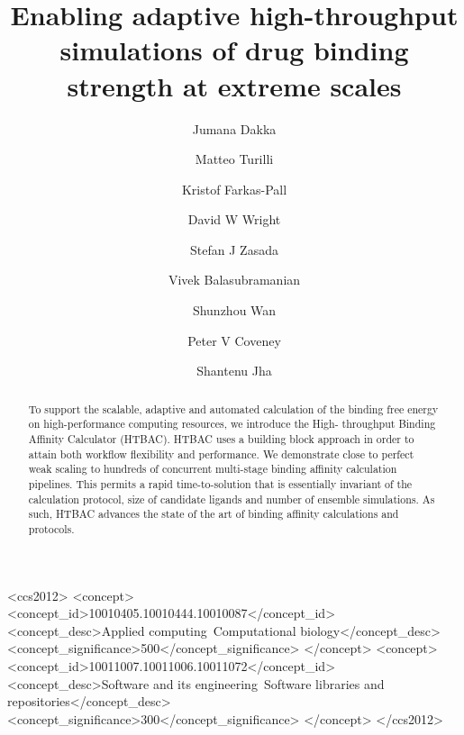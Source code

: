 \documentclass[manuscript, review, screen]{acmart}
\begin{document}
\title{Enabling adaptive high-throughput simulations of drug binding strength at extreme scales} 

\author{Jumana Dakka}
\orcid{}
\affiliation{%
  \institution{}
  \streetaddress{}
  \city{}
  \state{}
  \postcode{}
  \country{}}
\email{}
\author{Matteo Turilli}
\orcid{}
\affiliation{%
  \institution{}
  \city{}
  \country{}
}
\email{}
\author{Kristof Farkas-Pall}
\orcid{}
\email{}
\author{David W Wright}
\author{Stefan J Zasada}
\orcid{}
\email{}
\author{Vivek Balasubramanian}
\orcid{}
\affiliation{%
  \institution{}
  \city{}
  \country{}
}
\email{}
\author{Shunzhou Wan}
\orcid{}
\email{}
\author{Peter V Coveney}
\orcid{}
\email{}
\author{Shantenu Jha}
\orcid{}
\affiliation{%
  \institution{}
  \city{}
  \country{}
}
\email{}


\renewcommand\shortauthors{Dakka, J. et al}

\begin{abstract}
To support the scalable, adaptive and automated calculation of the binding
free energy on high-performance computing resources, we introduce the High-
throughput Binding Affinity Calculator (HTBAC). HTBAC uses a building block
approach in order to attain both workflow flexibility and
performance. We demonstrate close to perfect weak scaling to hundreds of
concurrent multi-stage binding affinity calculation pipelines. This permits
a rapid time-to-solution that is essentially invariant of the calculation
protocol, size of candidate ligands and number of ensemble simulations. As
such, HTBAC advances the state of the art of binding affinity calculations and
protocols.

\end{abstract}


%
%
\begin{CCSXML}
<ccs2012>
<concept>
<concept_id>10010405.10010444.10010087</concept_id>
<concept_desc>Applied computing~Computational biology</concept_desc>
<concept_significance>500</concept_significance>
</concept>
<concept>
<concept_id>10011007.10011006.10011072</concept_id>
<concept_desc>Software and its engineering~Software libraries and repositories</concept_desc>
<concept_significance>300</concept_significance>
</concept>
</ccs2012>
\end{CCSXML}
\end{document}
